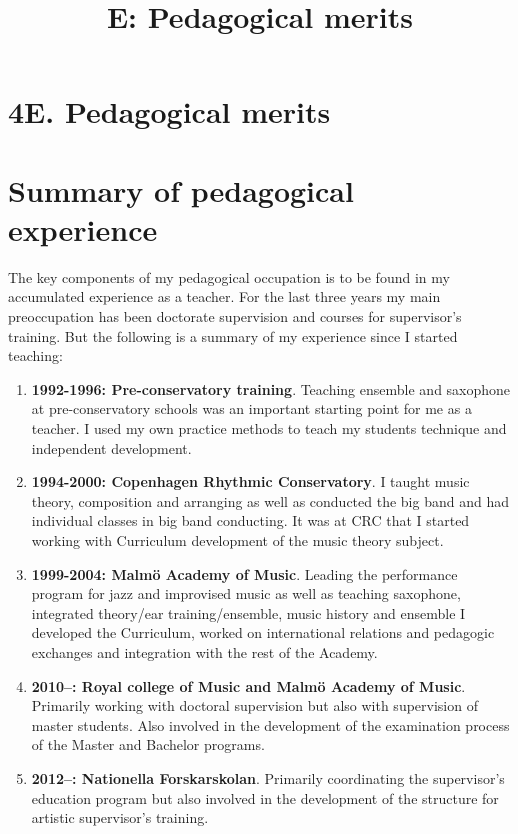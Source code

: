 \documentclass[a4paper]{article}
\title{E: Pedagogical merits}
\date{}
\begin{document}

\thispagestyle{empty}

\section*{\textsf{4E. Pedagogical merits}}
\section*{\textsf{Summary of pedagogical experience}}

The key components of my pedagogical occupation is to be found in my accumulated experience as a teacher. For the last three years my main preoccupation has been doctorate supervision and courses for supervisor's training. But the following is a summary of my experience since I started teaching:

\begin{enumerate}
\item \textbf{1992-1996: Pre-conservatory training}. Teaching ensemble and saxophone at pre-conservatory schools was an important starting point for me as a teacher. I used my own practice methods to teach my students technique and independent development.
\item \textbf{1994-2000: Copenhagen Rhythmic Conservatory}. I taught music theory, composition and arranging as well as conducted the big band and had individual classes in big band conducting. It was at CRC that I started working with Curriculum development of the music theory subject.
\item \textbf{1999-2004: Malmö Academy of Music}. Leading the performance program for jazz and improvised music as well as teaching saxophone, integrated theory/ear training/ensemble, music history and ensemble I developed the Curriculum, worked on international relations and pedagogic exchanges and integration with the rest of the Academy.
\item \textbf{2010--: Royal college of Music and Malmö Academy of Music}. Primarily working with doctoral supervision but also with supervision of master students. Also involved in the development of the examination process of the Master and Bachelor programs.
\item \textbf{2012--: Nationella Forskarskolan}. Primarily coordinating the supervisor's education program but also involved in the development of the structure for artistic supervisor's training.
\end{enumerate}
\end{document}
